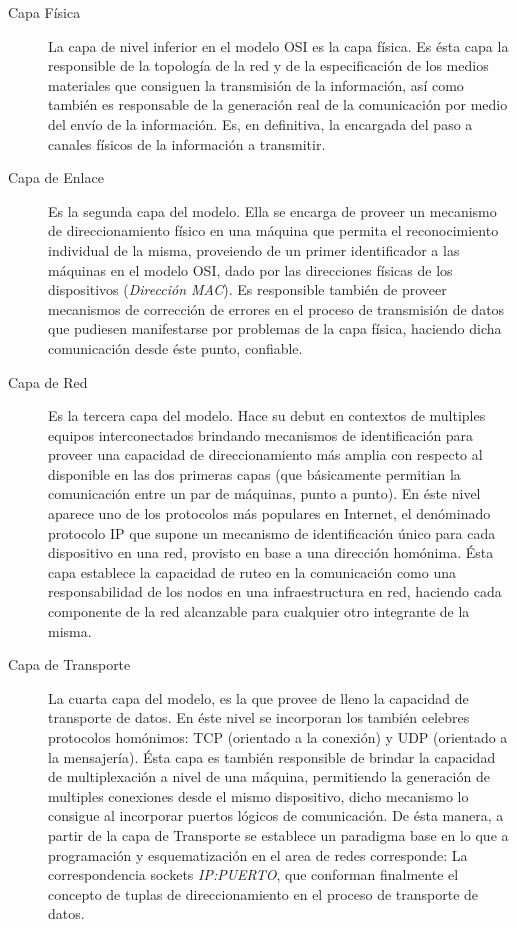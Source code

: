 \begin{description}
\item[Capa Física] La capa de nivel inferior en el modelo OSI es la capa física. Es ésta capa la responsible de la topología de la red y de la especificación de los medios materiales que consiguen la transmisión de la información, así como también es responsable de la generación real de la comunicación por medio del envío de la información. Es, en definitiva, la encargada del paso a canales físicos de la información a transmitir.

\item[Capa de Enlace] Es la segunda capa del modelo. Ella se encarga de proveer un mecanismo de direccionamiento físico en una máquina que permita el reconocimiento individual de la misma, proveiendo de un primer identificador a las máquinas en el modelo OSI, dado por las direcciones físicas de los dispositivos (\emph{Dirección MAC}). Es responsible también de proveer mecanismos de corrección de errores en el proceso de transmisión de datos que pudiesen manifestarse por problemas de la capa física, haciendo dicha comunicación desde éste punto, confiable.

\item[Capa de Red] Es la tercera capa del modelo. Hace su debut en contextos de multiples equipos interconectados brindando mecanismos de identificación para proveer una capacidad de direccionamiento más amplia con respecto al disponible en las dos primeras capas (que básicamente permitian la comunicación entre un par de máquinas, punto a punto). En éste nivel aparece uno de los protocolos más populares en Internet, el denóminado protocolo IP que supone un mecanismo de identificación único para cada dispositivo en una red, provisto en base a una dirección homónima. Ésta capa establece la capacidad de ruteo en la comunicación como una responsabilidad de los nodos en una infraestructura en red, haciendo cada componente de la red alcanzable para cualquier otro integrante de la misma.

\item[Capa de Transporte] La cuarta capa del modelo, es la que provee de lleno la capacidad de transporte de datos. En éste nivel se incorporan los también celebres protocolos homónimos: TCP (orientado a la conexión) y UDP (orientado a la mensajería). Ésta capa es también responsible de brindar la capacidad de multiplexación a nivel de una máquina, permitiendo la generación de multiples conexiones desde el mismo dispositivo, dicho mecanismo lo consigue al incorporar puertos lógicos de comunicación. De ésta manera, a partir de la capa de Transporte se establece un paradigma base en lo que a programación y esquematización en el area de redes corresponde: La correspondencia sockets \emph{IP:PUERTO}, que conforman finalmente el concepto de tuplas de direccionamiento en el proceso de transporte de datos.


\end{description}
